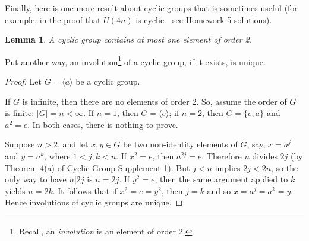 \documentclass[11pt]{article}
\newcommand{\<}{\ensuremath{\langle}}
\renewcommand{\>}{\ensuremath{\rangle}}
\theoremstyle{plain}
\newtheorem{lem}[thm]{Lemma}
\theoremstyle{definition}
\begin{document}
\begin{center}
\end{center}

Finally, here is one more result about cyclic groups that is sometimes
useful (for example, in the proof that $U(4n)$ is cyclic---see Homework 5
solutions).
\begin{lem}
A cyclic group contains at most one element of order 2.  
\end{lem}
\noindent Put another way, an involution\footnote{Recall, an \emph{involution} is an element
  of order 2.} of a cyclic group, if it exists, is unique.
\begin{proof}
Let $G = \<a \>$ be a cyclic group.

If $G$ is infinite, then there are no elements of order 2.
So, assume the order of $G$ is finite: $|G| = n < \infty$.
If $n=1$, then $G = \<e\>$; if $n=2$, then $G = \{e, a\}$ and $a^2 = e$.
In both cases, there is nothing to prove.

Suppose $n>2$, and let $x, y \in G$ be two non-identity elements of $G$, say, 
$x = a^j$ and $y = a^k$, where $1< j, k < n$. If $x^2 = e$, then $a^{2j}=e$.  
Therefore $n$ divides $2j$ (by Theorem 4(a) of Cyclic Group Supplement 1).
But $j < n$ implies $2j<2n$, so the only way to have $n|2j$ is
$n=2j$. If $y^2 = e$, then the same argument applied to $k$ yields $n=2k$.
It follows that if $x^2 = e = y^2$, then $j=k$ and so $x = a^{j}=a^k = y$. 
Hence involutions of cyclic groups are unique.   
\end{proof}
\end{document}
